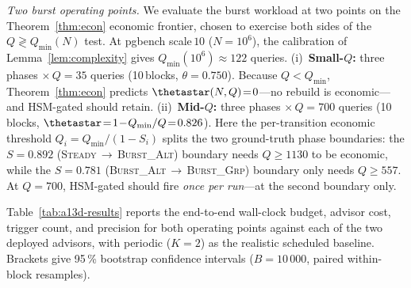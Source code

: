 %

\emph{Two burst operating points.} We evaluate the burst workload at two
points on the Theorem~\ref{thm:econ} economic frontier, chosen to
exercise both sides of the $Q \gtrless Q_{\min}(N)$ test.  At pgbench
scale\,$10$ ($N\!=\!10^6$), the calibration of Lemma~\ref{lem:complexity}
gives $Q_{\min}(10^6)\!\approx\!122$ queries.
(i)~\textbf{Small-$Q$:} three phases $\times\,Q\!=\!35$ queries
(10\,blocks, $\theta\!=\!0.750$).  Because $Q\!<\!Q_{\min}$,
Theorem~\ref{thm:econ} predicts $\thetastar(N,Q)\!=\!0$---no rebuild is
economic---and HSM-gated should retain.
(ii)~\textbf{Mid-$Q$:} three phases $\times\,Q\!=\!700$ queries
(10\,blocks, $\thetastar\!=\!1\!-\!Q_{\min}/Q\!=\!0.826$).  Here the
per-transition economic threshold $Q_i\!=\!Q_{\min}/(1\!-\!S_i)$ splits
the two ground-truth phase boundaries: the $S\!=\!0.892$
(\textsc{Steady}\,$\to$\,\textsc{Burst\_Alt}) boundary needs
$Q\!\ge\!1130$ to be economic, while the $S\!=\!0.781$
(\textsc{Burst\_Alt}\,$\to$\,\textsc{Burst\_Grp}) boundary only needs
$Q\!\ge\!557$.  At $Q\!=\!700$, HSM-gated should fire \emph{once per
run}---at the second boundary only.

Table~\ref{tab:a13d-results} reports the end-to-end wall-clock budget,
advisor cost, trigger count, and precision for both operating points
against each of the two deployed advisors, with periodic ($K\!=\!2$)
as the realistic scheduled baseline.  Brackets give 95\,\% bootstrap
confidence intervals ($B\!=\!10\,000$, paired within-block
resamples).

